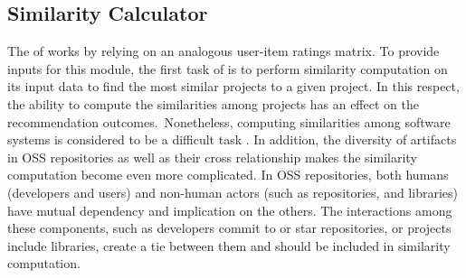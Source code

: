 



\subsection{Similarity Calculator} \label{sec:SimilarityCalculator}

The  of \CR works by relying on an analogous user-item ratings matrix. To provide 
inputs for this module, the first task of \CR is to perform similarity computation on its input data to find the 
most similar projects to a given project. In this respect, the ability to compute the similarities among projects has 
an effect on the recommendation outcomes.~Nonetheless, computing similarities among software systems is considered to 
be a difficult task \cite{McMillan:2012:DSS:2337223.2337267}. In addition, the diversity of artifacts in OSS 
repositories as well as their cross relationship makes the similarity computation become even more complicated. In OSS 
repositories, both humans (\ie developers and users) and non-human actors (such as repositories, and libraries) have 
mutual dependency and implication on the others. The interactions among these components, such as developers commit to 
or star repositories, or projects include libraries, create a tie between them and should be included in similarity 
computation.

